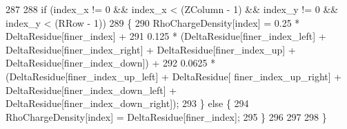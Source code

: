 \begin{DoxyCode}
287 
288     \textcolor{keywordflow}{if} (index\_x != 0 && index\_x < (ZColumn - 1) && index\_y != 0 && index\_y < (RRow - 1))
289     \{
290         RhoChargeDensity[index] = 0.25 * DeltaResidue[finer\_index] +
291                                 0.125 * (DeltaResidue[finer\_index\_left] + DeltaResidue[finer\_index\_right] +
       DeltaResidue[finer\_index\_up] + DeltaResidue[finer\_index\_down]) +
292                                 0.0625 * (DeltaResidue[finer\_index\_up\_left] + DeltaResidue[
      finer\_index\_up\_right] + DeltaResidue[finer\_index\_down\_left] + DeltaResidue[finer\_index\_down\_right]);
293     \} \textcolor{keywordflow}{else} \{
294         RhoChargeDensity[index] =  DeltaResidue[finer\_index];
295     \}
296     
297 
298 \}
\end{DoxyCode}
